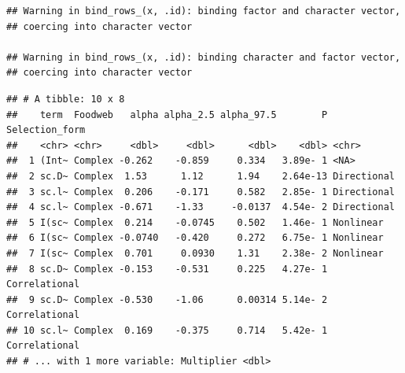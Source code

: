\documentclass[]{elsarticle} %
\newenvironment{Shaded}{\begin{snugshade}}{\end{snugshade}}
\newcommand{\KeywordTok}[1]{\textcolor[rgb]{0.13,0.29,0.53}{\textbf{#1}}}
\newcommand{\DataTypeTok}[1]{\textcolor[rgb]{0.13,0.29,0.53}{#1}}
\newcommand{\FloatTok}[1]{\textcolor[rgb]{0.00,0.00,0.81}{#1}}
\newcommand{\StringTok}[1]{\textcolor[rgb]{0.31,0.60,0.02}{#1}}
\newcommand{\CommentTok}[1]{\textcolor[rgb]{0.56,0.35,0.01}{\textit{#1}}}
\newcommand{\OperatorTok}[1]{\textcolor[rgb]{0.81,0.36,0.00}{\textbf{#1}}}
\newcommand{\NormalTok}[1]{#1}
\begin{document}
\begin{verbatim}
## Warning in bind_rows_(x, .id): binding factor and character vector,
## coercing into character vector

## Warning in bind_rows_(x, .id): binding character and factor vector,
## coercing into character vector
\end{verbatim}

\begin{Shaded}
\end{Shaded}

\begin{verbatim}
## # A tibble: 10 x 8
##    term  Foodweb   alpha alpha_2.5 alpha_97.5        P Selection_form
##    <chr> <chr>     <dbl>     <dbl>      <dbl>    <dbl> <chr>         
##  1 (Int~ Complex -0.262    -0.859     0.334   3.89e- 1 <NA>          
##  2 sc.D~ Complex  1.53      1.12      1.94    2.64e-13 Directional   
##  3 sc.l~ Complex  0.206    -0.171     0.582   2.85e- 1 Directional   
##  4 sc.l~ Complex -0.671    -1.33     -0.0137  4.54e- 2 Directional   
##  5 I(sc~ Complex  0.214    -0.0745    0.502   1.46e- 1 Nonlinear     
##  6 I(sc~ Complex -0.0740   -0.420     0.272   6.75e- 1 Nonlinear     
##  7 I(sc~ Complex  0.701     0.0930    1.31    2.38e- 2 Nonlinear     
##  8 sc.D~ Complex -0.153    -0.531     0.225   4.27e- 1 Correlational 
##  9 sc.D~ Complex -0.530    -1.06      0.00314 5.14e- 2 Correlational 
## 10 sc.l~ Complex  0.169    -0.375     0.714   5.42e- 1 Correlational 
## # ... with 1 more variable: Multiplier <dbl>
\end{verbatim}
\end{document}
